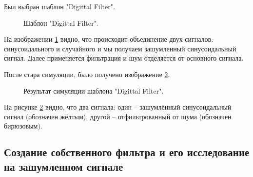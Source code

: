 \documentclass[a4paper,14pt]{extarticle}
\begin{document}
Был выбран шаблон "Digittal Filter".

\begin{figure}[H]
\caption{Шаблон "Digittal Filter".}
\label{001}
\end{figure}

На изображении \ref{001} видно, что происходит объединение двух сигналов: синусоидального и случайного и мы получаем зашумленный синусоидальный сигнал. Далее применяется фильтрация и шум отделяется от основного сигнала.
 
После стара симуляции, было получено изображение \ref{002}.

\begin{figure}[H]
\caption{Результат симуляции шаблона "Digittal Filter".}
\label{002}
\end{figure}

На рисунке \ref{002} видно, что два сигнала: один -- зашумлённый синусоидальный сигнал (обозначен жёлтым), другой -- отфильтрованный от шума (обозначен бирюзовым).


\subsection{Создание собственного фильтра и его исследование на зашумленном сигнале}
\end{document}
